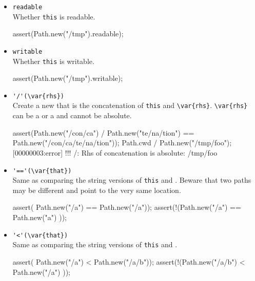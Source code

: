 \begin{itemize}
\item \lstinline|readable|\\
  Whether \lstinline|this| is readable.
\begin{urbiscript}[firstnumber=last]
assert(Path.new("/tmp").readable);
\end{urbiscript}

\item \lstinline|writable|\\
  Whether \lstinline|this| is writable.
\begin{urbiscript}[firstnumber=last]
assert(Path.new("/tmp").writable);
\end{urbiscript}

\item \lstinline|'/'(\var{rhs})|\\
  Create a new  that is the concatenation of
  \lstinline|this| and \lstinline|\var{rhs}|. \lstinline|\var{rhs}|
  can be a  or a  and cannot be absolute.
\begin{urbiscript}[firstnumber=last]
assert(Path.new("/con/ca") / Path.new("te/na/tion")
       == Path.new("/con/ca/te/na/tion"));
Path.cwd / Path.new("/tmp/foo");
[00000003:error] !!! /: Rhs of concatenation is absolute: /tmp/foo
\end{urbiscript}

\item \lstinline|'=='(\var{that})|\\
  Same as comparing the string versions of \lstinline|this| and
  .  Beware that two paths may be different and point to the
  very same location.
\begin{urbiscript}[firstnumber=last]
assert(  Path.new("/a")  == Path.new("/a"));
assert(!(Path.new("/a")  == Path.new("a")  ));
\end{urbiscript}

\item \lstinline|'<'(\var{that})|\\
  Same as comparing the string versions of \lstinline|this| and
  .
\begin{urbiscript}[firstnumber=last]
assert(  Path.new("/a")   < Path.new("/a/b"));
assert(!(Path.new("/a/b") < Path.new("/a")  ));
\end{urbiscript}

\end{itemize}


